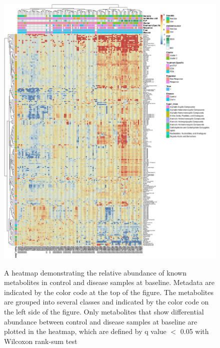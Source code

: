 \begin{figure}[hp]
\centering
{\includegraphics[scale=0.4,trim=0 0 0 0,clip]{Figure/F54_Metabolites_Heatmap.png}
}
\caption[A heatmap demonstrating the relative abundance of known metabolites]{A heatmap demonstrating the relative abundance of known metabolites in control and disease samples at baseline. Metadata are indicated by the color code at the top of the figure. The metabolites are grouped into several classes and indicated by the color code on the left side of the figure. Only metabolites that show differential abundance between control and disease samples at baseline are plotted in the heatmap, which are defined by q value $<$ 0.05 with Wilcoxon rank-sum test}
\label{F54_Metabolites_Heatmap}
\end{figure}



